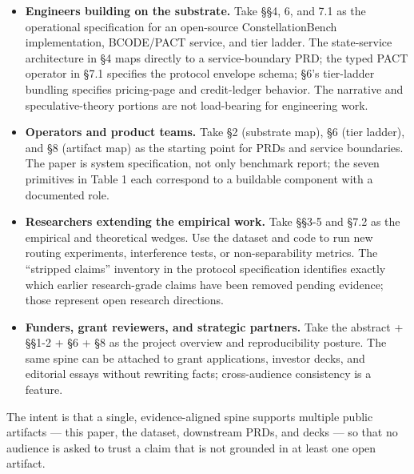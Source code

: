 \documentclass{article}
\providecommand{\tightlist}{\setlength{\itemsep}{0pt}\setlength{\parskip}{0pt}}
\begin{document}
\begin{itemize}
\tightlist
\item
  \textbf{Engineers building on the substrate.} Take §§4, 6, and 7.1 as
  the operational specification for an open-source ConstellationBench
  implementation, BCODE/PACT service, and tier ladder. The state-service
  architecture in §4 maps directly to a service-boundary PRD; the typed
  PACT operator in §7.1 specifies the protocol envelope schema; §6's
  tier-ladder bundling specifies pricing-page and credit-ledger
  behavior. The narrative and speculative-theory portions are not
  load-bearing for engineering work.
\item
  \textbf{Operators and product teams.} Take §2 (substrate map), §6
  (tier ladder), and §8 (artifact map) as the starting point for PRDs
  and service boundaries. The paper is system specification, not only
  benchmark report; the seven primitives in Table 1 each correspond to a
  buildable component with a documented role.
\item
  \textbf{Researchers extending the empirical work.} Take §§3-5 and §7.2
  as the empirical and theoretical wedges. Use the dataset and code to
  run new routing experiments, interference tests, or non-separability
  metrics. The ``stripped claims'' inventory in the protocol
  specification identifies exactly which earlier research-grade claims
  have been removed pending evidence; those represent open research
  directions.
\item
  \textbf{Funders, grant reviewers, and strategic partners.} Take the
  abstract + §§1-2 + §6 + §8 as the project overview and reproducibility
  posture. The same spine can be attached to grant applications,
  investor decks, and editorial essays without rewriting facts;
  cross-audience consistency is a feature.
\end{itemize}

The intent is that a single, evidence-aligned spine supports multiple
public artifacts --- this paper, the dataset, downstream PRDs, and decks
--- so that no audience is asked to trust a claim that is not grounded
in at least one open artifact.



\end{document}
